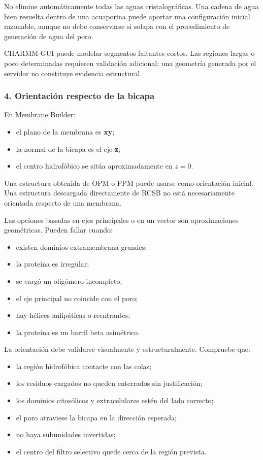 \documentclass[
  spanish,
  11pt,
  a4paper]{article}
\providecommand{\tightlist}{%
  \setlength{\itemsep}{0pt}\setlength{\parskip}{0pt}}
\begin{document}
No elimine automáticamente todas las aguas cristalográficas. Una cadena
de agua bien resuelta dentro de una acuaporina puede aportar una
configuración inicial razonable, aunque no debe conservarse si solapa
con el procedimiento de generación de agua del poro.

CHARMM-GUI puede modelar segmentos faltantes cortos. Las regiones largas
o poco determinadas requieren validación adicional; una geometría
generada por el servidor no constituye evidencia estructural.

\subsubsection{4. Orientación respecto de la
bicapa}\label{orientaciuxf3n-respecto-de-la-bicapa}

En Membrane Builder:

\begin{itemize}
\tightlist
\item
  el plano de la membrana es \textbf{xy};
\item
  la normal de la bicapa es el eje \textbf{z};
\item
  el centro hidrofóbico se sitúa aproximadamente en \(z=0\).
\end{itemize}

Una estructura obtenida de OPM o PPM puede usarse como orientación
inicial. Una estructura descargada directamente de RCSB no está
necesariamente orientada respecto de una membrana.

Las opciones basadas en ejes principales o en un vector son
aproximaciones geométricas. Pueden fallar cuando:

\begin{itemize}
\tightlist
\item
  existen dominios extramembrana grandes;
\item
  la proteína es irregular;
\item
  se cargó un oligómero incompleto;
\item
  el eje principal no coincide con el poro;
\item
  hay hélices anfipáticas o reentrantes;
\item
  la proteína es un barril beta asimétrico.
\end{itemize}

La orientación debe validarse visualmente y estructuralmente. Compruebe
que:

\begin{itemize}
\tightlist
\item
  la región hidrofóbica contacte con las colas;
\item
  los residuos cargados no queden enterrados sin justificación;
\item
  los dominios citosólicos y extracelulares estén del lado correcto;
\item
  el poro atraviese la bicapa en la dirección esperada;
\item
  no haya subunidades invertidas;
\item
  el centro del filtro selectivo quede cerca de la región prevista.
\end{itemize}
\end{document}

